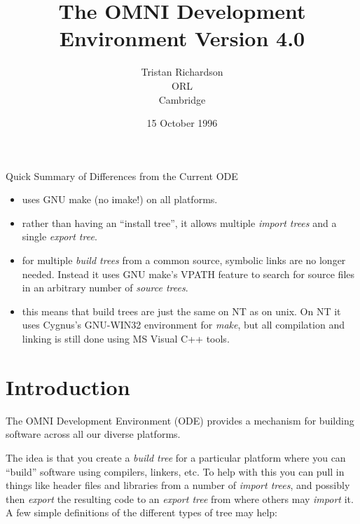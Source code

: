 \documentclass[11pt]{article}
\title{The OMNI Development Environment Version 4.0}
\author{Tristan Richardson\\
        ORL\\
        Cambridge}
\date{15 October 1996}
\begin{document}
\maketitle

{\Large Quick Summary of Differences from the Current ODE}

\begin{itemize}

\item uses GNU make (no imake!) on all platforms.

\item rather than having an ``install tree'', it allows multiple {\em
import trees} and a single {\em export tree}.

\item for multiple {\em build trees} from a common source, symbolic links are
no longer needed.  Instead it uses GNU make's VPATH feature to search for
source files in an arbitrary number of {\em source trees}.

\item this means that build trees are just the same on NT as on unix.  On NT it
uses Cygnus's GNU-WIN32 environment for {\em make}, but all compilation and
linking is still done using MS Visual C++ tools.

\end{itemize}

\section{Introduction}

The OMNI Development Environment (ODE) provides a mechanism for building
software across all our diverse platforms.

The idea is that you create a {\em build tree} for a particular platform where
you can ``build'' software using compilers, linkers, etc.  To help with this
you can pull in things like header files and libraries from a number of {\em
import trees}, and possibly then {\em export} the resulting code to an {\em
export tree} from where others may {\em import} it.  A few simple definitions
of the different types of tree may help:
\end{document}
